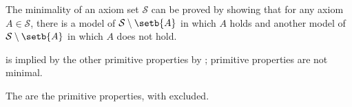 \documentclass[b5paper, english, oneside]{memoir}
\begin{document}
\begin{note}
\label{ProvingMinimality}
The minimality of an axiom set $\mathcal{S}$ can be proved by showing that for any axiom $A \in \mathcal{S}$, there is a model of $\mathcal{S} \setminus \setb{A}$ in which $A$ holds and another model of $\mathcal{S} \setminus \setb{A}$ in which $A$ does not hold.
\end{note}

\begin{note}
 is implied by the other primitive properties by ; primitive properties are not minimal.
\end{note}

\begin{note}
The  are the primitive properties, with  excluded.
\end{note}
\end{document}
